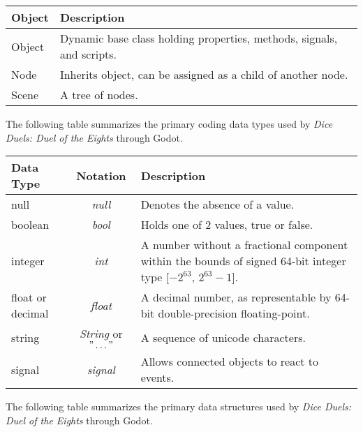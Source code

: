 \documentclass[12pt, titlepage]{article}
\begin{document}
\begin{center}
\renewcommand{\arraystretch}{1.2}
\noindent 
\begin{tabular}{l l} 
\toprule 
\textbf{Object} & \textbf{Description}\\ 
\midrule
Object & Dynamic base class holding properties, methods, signals, and scripts.\\
Node & Inherits object, can be assigned as a child of another node.\\
Scene & A tree of nodes.\\
\bottomrule
\end{tabular} 
\end{center}

The following table summarizes the primary coding data types used by \textit{Dice Duels: Duel of the Eights} through Godot.

\begin{center}
\renewcommand{\arraystretch}{1.2}
\noindent 
\begin{tabular}{p{1.5cm} c p{10cm}} 
\toprule 
\textbf{Data Type} & \textbf{Notation} & \textbf{Description}\\ 
\midrule
null & \textit{null} & Denotes the absence of a value. \\
boolean & \textit{bool} & Holds one of 2 values, true or false.\\
integer & \textit{int} & A number without a fractional component within the bounds of signed 64-bit integer type [$-2^{63}$, $2^{63} - 1$].\\
float or decimal & \textit{float} & A decimal number, as representable by 64-bit double-precision floating-point.\\
string & \textit{String} or $"\dots"$ & A sequence of unicode characters.\\
signal & \textit{signal} & Allows connected objects to react to events.\\
\bottomrule
\end{tabular} 
\end{center}

The following table summarizes the primary data structures used by \textit{Dice Duels: Duel of the Eights} through Godot.
\end{document}

